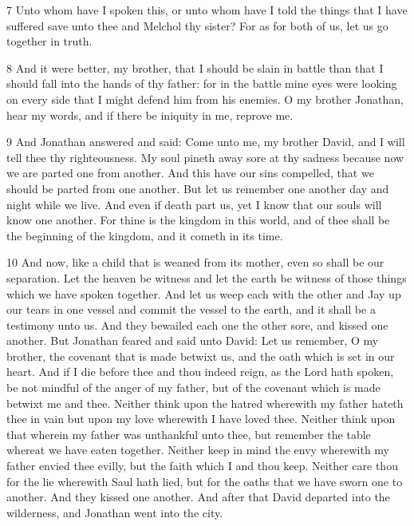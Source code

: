 \par 7 Unto whom have I spoken this, or unto whom have I told the things that I have suffered save unto thee and Melchol thy sister? For as for both of us, let us go together in truth. 

\par 8 And it were better, my brother, that I should be slain in battle than that I should fall into the hands of thy father: for in the battle mine eyes were looking on every side that I might defend him from his enemies. O my brother Jonathan, hear my words, and if there be iniquity in me, reprove me.

\par 9 And Jonathan answered and said: Come unto me, my brother David, and I will tell thee thy righteousness. My soul pineth away sore at thy sadness because now we are parted one from another. And this have our sins compelled, that we should be parted from one another. But let us remember one another day and night while we live. And even if death part us, yet I know that our souls will know one another. For thine is the kingdom in this world, and of thee shall be the beginning of the kingdom, and it cometh in its time. 

\par 10 And now, like a child that is weaned from its mother, even so shall be our separation. Let the heaven be witness and let the earth be witness of those things which we have spoken together. And let us weep each with the other and Jay up our tears in one vessel and commit the vessel to the earth, and it shall be a testimony unto us. And they bewailed each one the other sore, and kissed one another. But Jonathan feared and said unto David: Let us remember, O my brother, the covenant that is made betwixt us, and the oath which is set in our heart. And if I die before thee and thou indeed reign, as the Lord hath spoken, be not mindful of the anger of my father, but of the covenant which is made betwixt me and thee. Neither think upon the hatred wherewith my father hateth thee in vain but upon my love wherewith I have loved thee. Neither think upon that wherein my father was unthankful unto thee, but remember the table whereat we have eaten together. Neither keep in mind the envy wherewith my father envied thee evilly, but the faith which I and thou keep. Neither care thou for the lie wherewith Saul hath lied, but for the oaths that we have sworn one to another. And they kissed one another. And after that David departed into the wilderness, and Jonathan went into the city.

